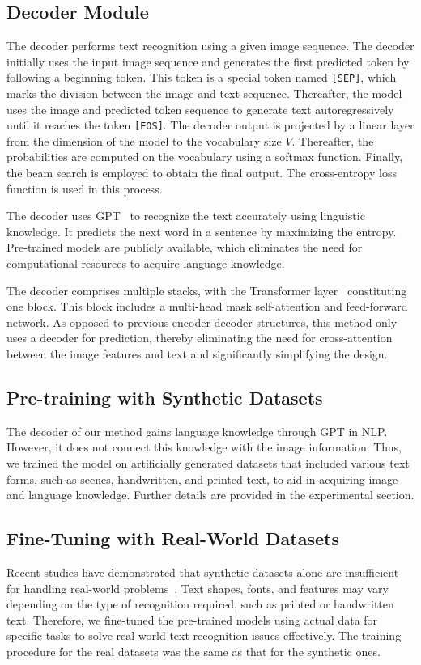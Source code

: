 \documentclass[10pt,twocolumn,letterpaper]{article}
\begin{document}
\subsection{Decoder Module}
The decoder performs text recognition using a given image sequence. 
The decoder initially uses the input image sequence and generates the first predicted token by following a beginning token.
This token is a special token named \texttt{[SEP]}, which marks the division between the image and text sequence. 
Thereafter, the model uses the image and predicted token sequence to generate text autoregressively until it reaches the token \texttt{[EOS]}. 
The decoder output is projected by a linear layer from the dimension of the model to the vocabulary size $V$. 
Thereafter, the probabilities are computed on the vocabulary using a softmax function. 
Finally, the beam search is employed to obtain the final output. 
The cross-entropy loss function is used in this process.


The decoder uses GPT~\cite{radford2018gpt, radford2019language} to recognize the text accurately using linguistic knowledge. 
It predicts the next word in a sentence by maximizing the entropy. 
Pre-trained models are publicly available, which eliminates the need for computational resources to acquire language knowledge.

The decoder comprises multiple stacks, with the Transformer layer~\cite{vaswani2017transformer} constituting one block.
This block includes a multi-head mask self-attention and feed-forward network. 
As opposed to previous encoder-decoder structures, this method only uses a decoder for prediction, thereby eliminating the need for cross-attention between the image features and text and significantly simplifying the design. 


\subsection{Pre-training with Synthetic Datasets}
The decoder of our method gains language knowledge through GPT in NLP. 
However, it does not connect this knowledge with the image information. 
Thus, we trained the model on artificially generated datasets that included various text forms, such as scenes, handwritten, and printed text, to aid in acquiring image and language knowledge. 
Further details are provided in the experimental section.


\subsection{Fine-Tuning with Real-World Datasets}
Recent studies have demonstrated that synthetic datasets alone are insufficient for handling real-world problems~\cite{baek2021TRBA, bautista2022parseq}. 
Text shapes, fonts, and features may vary depending on the type of recognition required, such as printed or handwritten text.
Therefore, we fine-tuned the pre-trained models using actual data for specific tasks to solve real-world text recognition issues effectively.
The training procedure for the real datasets was the same as that for the synthetic ones.
\end{document}
